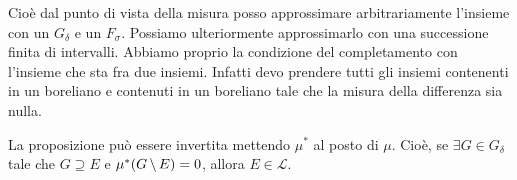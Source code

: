 \documentclass[a4paper]{article}
\begin{document}
\begin{radioactive}
Cioè dal punto di vista della misura posso approssimare arbitrariamente
l'insieme con un \(G_\delta\) e un \(F_\sigma\).
Possiamo ulteriormente approssimarlo con una successione finita di intervalli.
Abbiamo proprio la condizione del completamento con l'insieme che sta fra due insiemi.
Infatti devo prendere tutti gli insiemi contenenti in un boreliano e contenuti in
un boreliano tale che la misura della differenza sia nulla.
\end{radioactive}

\begin{radioactive}
La proposizione può essere invertita mettendo \(\mu^*\)
al posto di \(\mu\). Cioè, se \(\exists G \in G_\delta\)
tale che \(G \supseteq E\) e \(\mu^*(G \,\backslash\, E) = 0\),
allora \(E \in \mathcal L\).
\end{radioactive}
\end{document}
